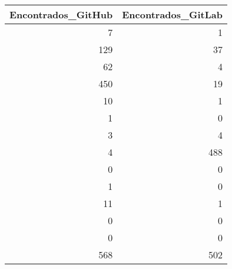 \begin{tabular}{rr}
\toprule
 Encontrados\_GitHub &  Encontrados\_GitLab \\
\midrule
                  7 &                   1 \\
                129 &                  37 \\
                 62 &                   4 \\
                450 &                  19 \\
                 10 &                   1 \\
                  1 &                   0 \\
                  3 &                   4 \\
                  4 &                 488 \\
                  0 &                   0 \\
                  1 &                   0 \\
                 11 &                   1 \\
                  0 &                   0 \\
                  0 &                   0 \\
                568 &                 502 \\
\bottomrule
\end{tabular}
